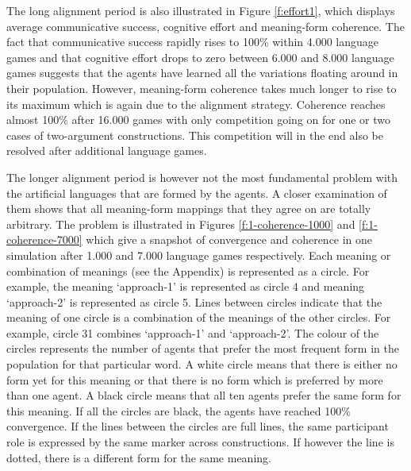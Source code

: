 The long alignment period is also illustrated in Figure \ref{f:effort1}, which displays average communicative success, cognitive effort and meaning-form coherence. The fact that communicative success rapidly rises to 100\% within 4.000 language games and that cognitive effort drops to zero between 6.000 and 8.000 language games suggests that the agents have learned all the variations floating around in their population. However, meaning-form coherence takes much longer to rise to its maximum which is again due to the alignment strategy. Coherence reaches almost 100\% after 16.000 games with only competition going on for one or two cases of two-argument constructions. This competition will in the end also be resolved after additional language games.

The longer alignment period is however not the most fundamental problem with the artificial languages that are formed by the agents. A closer examination of them shows that all meaning-form mappings that they agree on are totally arbitrary. The problem is illustrated in Figures \ref{f:1-coherence-1000} and \ref{f:1-coherence-7000} which give a snapshot of convergence and coherence in one simulation after 1.000 and 7.000 language games respectively. Each meaning or combination of meanings (see the Appendix) is represented as a circle. For example, the meaning `approach-1' is represented as circle 4 and meaning `approach-2' is represented as circle 5. Lines between circles indicate that the meaning of one circle is a combination of the meanings of the other circles. For example, circle 31 combines `approach-1' and `approach-2'. The colour of the circles represents the number of agents that prefer the most frequent form in the population for that particular word. A white circle means that there is either no form yet for this meaning or that there is no form which is preferred by more than one agent. A black circle means that all ten agents prefer the same form for this meaning. If all the circles are black, the agents have reached 100\% convergence. If the lines between the circles are full lines, the same participant role is expressed by the same marker across constructions. If however the line is dotted, there is a different form for the same meaning.

